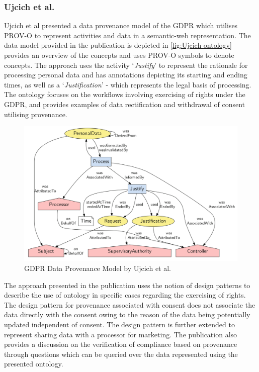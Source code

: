 \subsubsection{Ujcich et al.}\label{sec:sota:gdpr-semweb:ujcich}
Ujcich et al \cite{belhajjame_provenance_2018} presented a data provenance model of the GDPR which utilises PROV-O \cite{lebo_prov-o_2013} to represent activities and data in a semantic-web representation.
The data model provided in the publication is depicted in \autoref{fig:Ujcich-ontology} provides an overview of the concepts and uses PROV-O \cite{lebo_prov-o_2013} symbols to denote concepts.
The approach uses the activity `\textit{Justify}' to represent the rationale for processing personal data and has annotations depicting its starting and ending times, as well as a `\textit{Justification}' - which represents the legal basis of processing. The ontology focuses on the workflows involving exercising of rights under the GDPR, and provides examples of data rectification and withdrawal of consent utilising provenance.
\begin{figure}[htbp]
    \centering
    \includegraphics[width=\linewidth]{img/Ujcich_ontology.png}
    \caption{GDPR Data Provenance Model by Ujcich et al. \cite{belhajjame_provenance_2018}}
    \label{fig:Ujcich-ontology}
\end{figure}

The approach presented in the publication uses the notion of design patterns to describe the use of ontology in specific cases regarding the exercising of rights. The design pattern for provenance associated with consent does not associate the data directly with the consent owing to the reason of the data being potentially updated independent of consent. The design pattern is further extended to represent sharing data with a processor for marketing. The publication also provides a discussion on the verification of compliance based on provenance through questions which can be queried over the data represented using the presented ontology.

